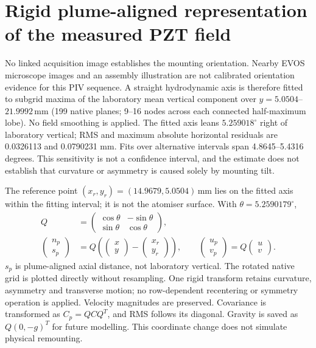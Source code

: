 \section{Rigid plume-aligned representation of the measured PZT field}
No linked acquisition image establishes the mounting orientation. Nearby EVOS
microscope images and an assembly illustration are not calibrated orientation
evidence for this PIV sequence. A straight hydrodynamic axis is therefore fitted
to subgrid maxima of the laboratory mean vertical component over
$y=5.0504$--$21.9992\,$mm
(199 native planes; 9--16
nodes across each connected half-maximum lobe). No field smoothing is applied.
The fitted axis leans $5.259018^\circ$ right of laboratory vertical;
RMS and maximum absolute horizontal residuals are 0.0326113
and 0.0790231 mm. Fits over alternative intervals span
4.8645--5.4316 degrees. This sensitivity is not a confidence
interval, and the estimate does not establish that curvature or asymmetry is caused
solely by mounting tilt.

The reference point $(x_r,y_r)=(14.9679,5.0504)\,$mm lies on
the fitted axis within the fitting interval; it is not the atomiser surface.
With $\theta=5.2590179^\circ$,
\begin{align}
Q&=\begin{pmatrix}\cos\theta&-\sin\theta\\\sin\theta&\cos\theta\end{pmatrix},\\
\begin{pmatrix}n_p\\s_p\end{pmatrix}&=Q\left(\begin{pmatrix}x\\y\end{pmatrix}-
\begin{pmatrix}x_r\\y_r\end{pmatrix}\right),\qquad
\begin{pmatrix}u_p\\v_p\end{pmatrix}=Q\begin{pmatrix}u\\v\end{pmatrix}.
\end{align}
$s_p$ is plume-aligned axial distance, not laboratory vertical. The rotated native
grid is plotted directly without resampling. One rigid transform retains curvature,
asymmetry and transverse motion; no row-dependent recentering or symmetry operation
is applied. Velocity magnitudes are preserved. Covariance is transformed as
$C_p=QCQ^T$, and RMS follows its diagonal. Gravity is saved as $Q(0,-g)^T$ for
future modelling. This coordinate change does not simulate physical remounting.

